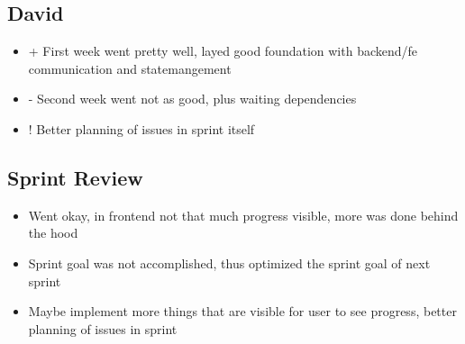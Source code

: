 \subsection{David}
\begin{itemize}
    \item + First week went pretty well, layed good foundation with backend/fe communication and statemangement
    \item - Second week went not as good, plus waiting dependencies 
    \item ! Better planning of issues in sprint itself
\end{itemize}

\subsection{Sprint Review}
\begin{itemize}
    \item Went okay, in frontend not that much progress visible, more was done behind the hood
    \item Sprint goal was not accomplished, thus optimized the sprint goal of next sprint
    \item Maybe implement more things that are visible for user to see progress, better planning of issues in sprint
\end{itemize}